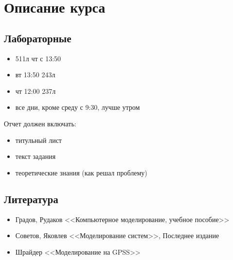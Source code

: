 \section{Описание курса}

\subsection{Лабораторные}

\begin{itemize}
    \item 511л чт с 13:50
    \item вт 13:50 243л
    \item чт 12:00 237л
    \item все дни, кроме среду с 9:30, лучше утром
\end{itemize}

Отчет должен включать:

\begin{itemize}
    \item титульный лист
    \item текст задания
    \item теоретические знания (как решал проблему)
\end{itemize}

\subsection{Литература}

\begin{itemize}
    \item Градов, Рудаков <<Компьютерное моделирование, учебное пособие>>
    \item Советов, Яковлев <<Моделирование систем>>, Последнее издание
    \item Шрайдер <<Моделирование на GPSS>>
\end{itemize}
